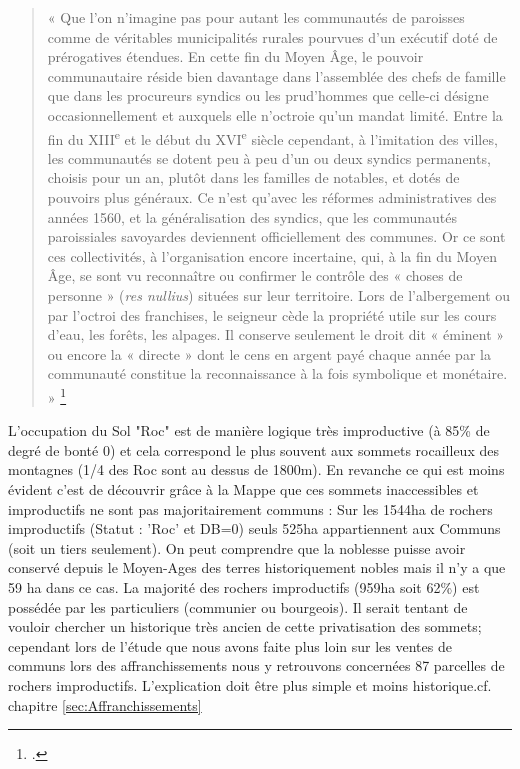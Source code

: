 \documentclass[12pt,a4paper]{report}
\begin{document}
\begin{quote}
	« Que l’on n’imagine pas pour autant les communautés de paroisses comme de véritables municipalités rurales pourvues d’un exécutif doté de prérogatives étendues. En cette fin du Moyen Âge, le pouvoir communautaire réside bien davantage dans l’assemblée des chefs de famille que dans les procureurs syndics ou les prud’hommes que celle-ci désigne occasionnellement et auxquels elle n’octroie qu’un mandat limité. Entre la fin du XIII\textsuperscript{e} et le début du XVI\textsuperscript{e} siècle cependant, à l’imitation des villes, les communautés se dotent peu à peu d’un ou deux syndics permanents, choisis pour un an, plutôt dans les familles de notables, et dotés de pouvoirs plus généraux. Ce n’est qu’avec les réformes administratives des années 1560, et la généralisation des syndics, que les communautés paroissiales savoyardes deviennent officiellement des communes. Or ce sont ces collectivités, à l’organisation encore incertaine, qui, à la fin du Moyen Âge, se sont vu reconnaître ou confirmer le contrôle des « choses de personne » (\textit{res nullius}) situées sur leur territoire. Lors de l’albergement ou par l’octroi des franchises, le seigneur cède la propriété utile sur les cours d’eau, les forêts, les alpages. Il conserve seulement le droit dit « éminent » ou encore la « directe » dont le cens en argent payé chaque année par la communauté constitue la reconnaissance à la fois symbolique et monétaire. »
	\footcite[86]{Mouthon2016}
\end{quote}


L'occupation du Sol "Roc" est de manière logique très improductive (à 85\% de degré de bonté 0) et cela correspond le plus souvent aux sommets rocailleux des montagnes (1/4 des Roc sont au dessus de 1800m). En revanche ce qui est moins évident c'est de découvrir grâce à la Mappe que ces sommets inaccessibles et improductifs ne sont pas majoritairement communs : 
Sur les 1544ha de rochers improductifs (Statut : 'Roc' et DB=0) seuls 525ha appartiennent aux Communs (soit un tiers seulement). 
On peut comprendre que la noblesse puisse avoir conservé depuis le Moyen-Ages des terres historiquement nobles mais il n'y a que 59 ha dans ce cas.
La majorité des rochers improductifs (959ha soit 62\%) est possédée par les particuliers (communier ou bourgeois). Il serait tentant de vouloir chercher un historique très ancien de cette privatisation des sommets; cependant lors de l'étude que nous avons faite plus loin sur les ventes de communs lors des affranchissements nous y retrouvons concernées 87 parcelles de rochers improductifs. L'explication doit être plus simple et moins historique.cf. chapitre \ref{sec:Affranchissements}
\end{document}
